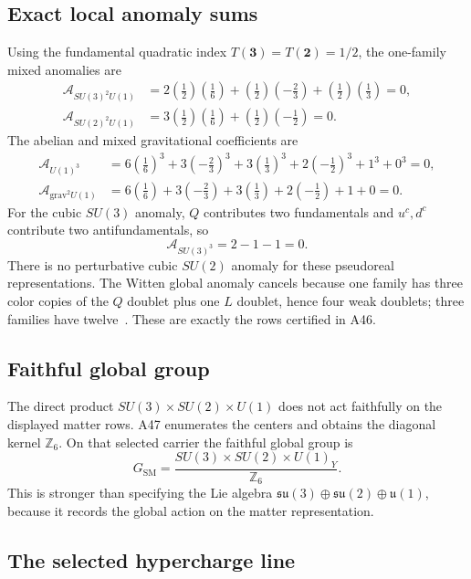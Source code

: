 \documentclass[11pt]{article}
\newcommand{\GSM}{G_{\mathrm{SM}}}
\begin{document}
\subsection{Exact local anomaly sums}

Using the fundamental quadratic index $T(\mathbf 3)=T(\mathbf 2)=1/2$,
the one-family mixed anomalies are
\[
\begin{aligned}
\mathcal A_{SU(3)^2U(1)}
 &=2\left(\frac12\right)\left(\frac16\right)
   +\left(\frac12\right)\left(-\frac23\right)
   +\left(\frac12\right)\left(\frac13\right)=0,\\
\mathcal A_{SU(2)^2U(1)}
 &=3\left(\frac12\right)\left(\frac16\right)
   +\left(\frac12\right)\left(-\frac12\right)=0.
\end{aligned}
\]
The abelian and mixed gravitational coefficients are
\[
\begin{aligned}
\mathcal A_{U(1)^3}
 &=6\left(\frac16\right)^3
  +3\left(-\frac23\right)^3
  +3\left(\frac13\right)^3
  +2\left(-\frac12\right)^3+1^3+0^3=0,\\
\mathcal A_{\mathrm{grav}^2U(1)}
 &=6\left(\frac16\right)
  +3\left(-\frac23\right)
  +3\left(\frac13\right)
  +2\left(-\frac12\right)+1+0=0.
\end{aligned}
\]
For the cubic $SU(3)$ anomaly, $Q$ contributes two fundamentals and
$u^c,d^c$ contribute two antifundamentals, so
\[
 \mathcal A_{SU(3)^3}=2-1-1=0.
\]
There is no perturbative cubic $SU(2)$ anomaly for these pseudoreal
representations.  The Witten global anomaly cancels because one family has
three color copies of the $Q$ doublet plus one $L$ doublet, hence four weak
doublets; three families have twelve~\cite{WittenSU2}.  These are exactly the
rows certified in A46.

\subsection{Faithful global group}

The direct product $SU(3)\times SU(2)\times U(1)$ does not act faithfully on
the displayed matter rows.  A47 enumerates the centers and obtains the
diagonal kernel $\mathbb Z_6$.  On that selected carrier the faithful global
group is
\[
 \GSM
 =
 \frac{SU(3)\times SU(2)\times U(1)_Y}{\mathbb Z_6}.
\]
This is stronger than specifying the Lie algebra
$\mathfrak{su}(3)\oplus\mathfrak{su}(2)\oplus\mathfrak u(1)$, because it records
the global action on the matter representation.

\subsection{The selected hypercharge line}
\end{document}

